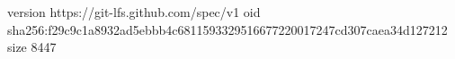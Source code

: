 version https://git-lfs.github.com/spec/v1
oid sha256:f29c9c1a8932ad5ebbb4c6811593329516677220017247cd307caea34d127212
size 8447
